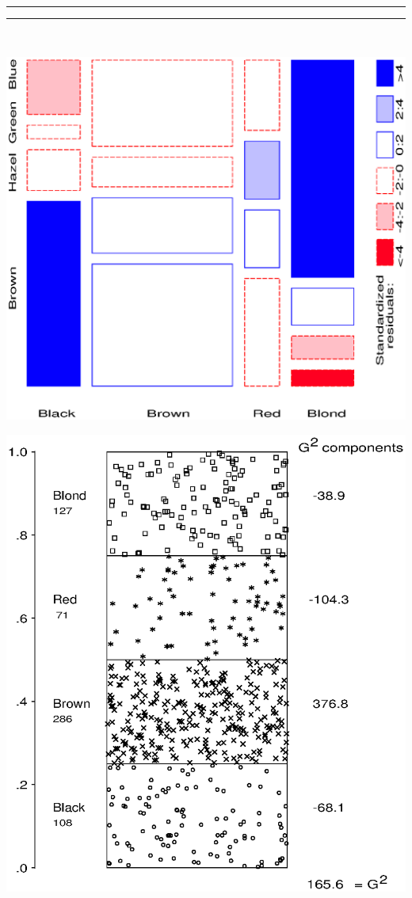 \begin{center}
 \rule[-4pt]{0.5pt}{4pt}\hrulefill\rule[-4pt]{0.5pt}{4pt}\\
 \begin{minipage}[c]{.33\linewidth}
  \includegraphics[width=1\linewidth]{ch4/fig/mosaic34}
 \end{minipage}%
 \hfill
 \begin{minipage}[c]{.33\linewidth}
  \includegraphics[width=1\linewidth,clip]{ch1/fig/mosdemo4}

\end{minipage}
\end{center}
